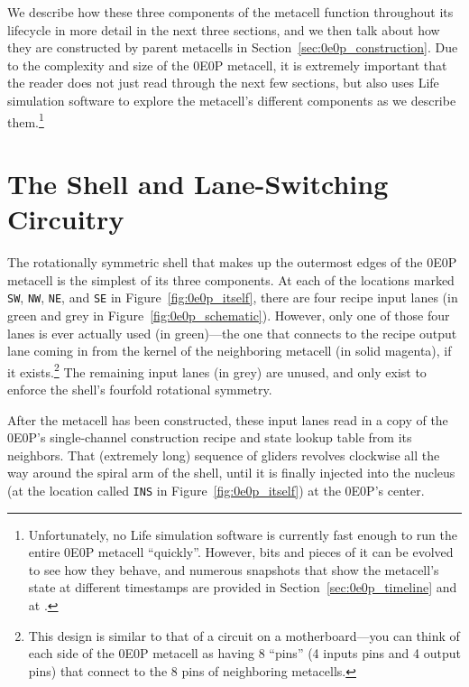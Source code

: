 We describe how these three components of the metacell function throughout its lifecycle in more detail in the next three sections, and we then talk about how they are constructed by parent metacells in Section~\ref{sec:0e0p_construction}. Due to the complexity and size of the 0E0P metacell, it is extremely important that the reader does not just read through the next few sections, but also uses Life simulation software to explore the metacell's different components as we describe them.\footnote{Unfortunately, no Life simulation software is currently fast enough to run the entire 0E0P metacell ``quickly''. However, bits and pieces of it can be evolved to see how they behave, and numerous snapshots that show the metacell's state at different timestamps are provided in Section~\ref{sec:0e0p_timeline} and at .}


\section{The Shell and Lane-Switching Circuitry}\label{sec:0e0p_structure_shell}

The rotationally symmetric shell that makes up the outermost edges of the 0E0P metacell is the simplest of its three components. At each of the locations marked \texttt{SW}, \texttt{NW}, \texttt{NE}, and \texttt{SE} in Figure~\ref{fig:0e0p_itself}, there are four recipe input lanes (in green and grey in Figure~\ref{fig:0e0p_schematic}). However, only one of those four lanes is ever actually used (in green)---the one that connects to the recipe output lane coming in from the kernel of the neighboring metacell (in solid magenta), if it exists.\footnote{This design is similar to that of a circuit on a motherboard---you can think of each side of the 0E0P metacell as having 8 ``pins'' (4 inputs pins and 4 output pins) that connect to the 8 pins of neighboring metacells.} The remaining input lanes (in grey) are unused, and only exist to enforce the shell's fourfold rotational symmetry.

After the metacell has been constructed, these input lanes read in a copy of the 0E0P's single-channel construction recipe and state lookup table from its neighbors. That (extremely long) sequence of gliders revolves clockwise all the way around the spiral arm of the shell, until it is finally injected into the nucleus (at the location called \texttt{INS} in Figure~\ref{fig:0e0p_itself}) at the 0E0P's center.

